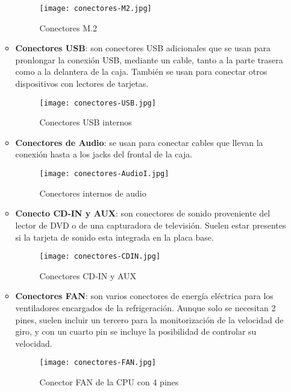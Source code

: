 \begin{itemize}
\begin{itemize}
    \begin{figure}[H]
        \centering
        \texttt{[image: conectores-M2.jpg]}
        \caption{Conectores M.2}
    \end{figure}

    \item \textbf{Conectores USB}: son conectores USB adicionales que se usan para pronlongar la conexión USB, mediante un cable, tanto a la parte trasera como a la delantera de la caja. También se usan para conectar otros dispositivos con lectores de tarjetas.

    \begin{figure}[H]
        \centering
        \texttt{[image: conectores-USB.jpg]}
        \caption{Conectores USB internos}
    \end{figure}

    \item \textbf{Conectores de Audio}: se usan para conectar cables que llevan la conexión hasta a los jacks del frontal de la caja.

    \begin{figure}[H]
        \centering
        \texttt{[image: conectores-AudioI.jpg]}
        \caption{Conectores internos de audio}
    \end{figure}

    \item \textbf{Conecto CD-IN y AUX}: son conectores de sonido proveniente  del lector de DVD o de una capturadora de televisión. Suelen estar presentes si la tarjeta de sonido esta integrada en la placa base.

    \begin{figure}[H]
        \centering
        \texttt{[image: conectores-CDIN.jpg]}
        \caption{Conectores CD-IN y AUX}
    \end{figure}

    \item \textbf{Conectores FAN}: son varios conectores de energía eléctrica para los ventiladores encargados de la refrigeración. Aunque solo se necesitan 2 pines, suelen incluir un tercero para la monitorización de la velocidad de giro, y con un cuarto pin se incluye la posibilidad de controlar su velocidad.

    \begin{figure}[H]
        \centering
        \texttt{[image: conectores-FAN.jpg]}
        \caption{Conector FAN de la CPU con 4 pines}
    \end{figure}


\end{itemize}
\end{itemize}
